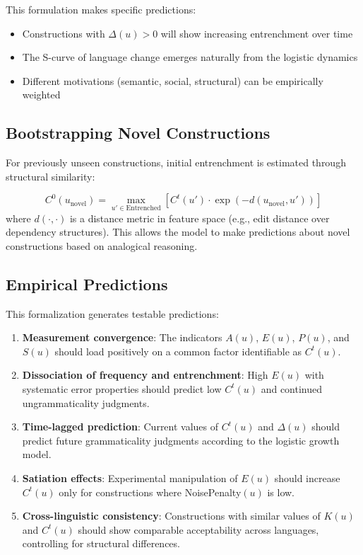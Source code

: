\documentclass[12pt,letterpaper]{article}
\begin{document}
This formulation makes specific predictions:
\begin{itemize}
    \item Constructions with $\Delta(u) > 0$ will show increasing entrenchment over time
    \item The S-curve of language change emerges naturally from the logistic dynamics
    \item Different motivations (semantic, social, structural) can be empirically weighted
\end{itemize}

\subsection{Bootstrapping Novel Constructions}

For previously unseen constructions, initial entrenchment is estimated through structural similarity:

\[
C^0(u_{\text{novel}}) = \max_{u' \in \text{Entrenched}} \left[ C^t(u') \cdot \exp(-d(u_{\text{novel}}, u')) \right]
\]
where $d(\cdot, \cdot)$ is a distance metric in feature space (e.g., edit distance over dependency structures). This allows the model to make predictions about novel constructions based on analogical reasoning.

\subsection{Empirical Predictions}

This formalization generates testable predictions:

\begin{enumerate}
    \item \textbf{Measurement convergence}: The indicators $A(u)$, $E(u)$, $P(u)$, and $S(u)$ should load positively on a common factor identifiable as $C^t(u)$.
    
    \item \textbf{Dissociation of frequency and entrenchment}: High $E(u)$ with systematic error properties should predict low $C^t(u)$ and continued ungrammaticality judgments.
    
    \item \textbf{Time-lagged prediction}: Current values of $C^t(u)$ and $\Delta(u)$ should predict future grammaticality judgments according to the logistic growth model.
    
    \item \textbf{Satiation effects}: Experimental manipulation of $E(u)$ should increase $C^t(u)$ only for constructions where NoisePenalty$(u)$ is low.
    
    \item \textbf{Cross-linguistic consistency}: Constructions with similar values of $K(u)$ and $C^t(u)$ should show comparable acceptability across languages, controlling for structural differences.
\end{enumerate}
\end{document}
